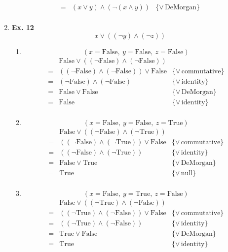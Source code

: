 \documentclass[fleqn]{article}
\newenvironment{proof}
  {\[\begin{array}{lll}}
  {\end{array}\]}
\newcommand{\law}[2][\!]{\{{#1\,}\mbox{{#2}}\}}
\newcommand{\True}[0]{\mathrm{True}}
\newcommand{\False}[0]{\mathrm{False}}
\begin{document}
\begin{enumerate}
\begin{proof}
        = & (x \vee y) \wedge (\neg (x \wedge y)) & \law[\vee]{DeMorgan} \\
      \end{proof}
    \item
      \textbf{ Ex. 12 }
      \[ x \vee ((\neg y) \wedge (\neg z)) \]
      \begin{enumerate}
        \item
          \[ (x = \False,\ y = \False,\ z = \False) \]
          \begin{proof}
              & \False \vee ((\neg \False) \wedge (\neg \False)) & \\
            = & ((\neg \False) \wedge (\neg \False)) \vee \False & \law[\vee]{commutative} \\
            = & (\neg \False) \wedge (\neg \False) & \law[\vee]{identity} \\
            = & \False \vee \False & \law[\vee]{DeMorgan} \\
            = & \False & \law[\vee]{identity} \\
          \end{proof}
        \item
          \[ (x = \False,\ y = \False,\ z = \True) \]
          \begin{proof}
              & \False \vee ((\neg \False) \wedge (\neg \True)) & \\
            = & ((\neg \False) \wedge (\neg \True)) \vee \False & \law[\vee]{commutative} \\
            = & ((\neg \False) \wedge (\neg \True)) & \law[\vee]{identity} \\
            = & \False \vee \True & \law[\vee]{DeMorgan} \\
            = & \True & \law[\vee]{null} \\
          \end{proof}
        \item
          \[ (x = \False,\ y = \True,\ z = \False) \]
          \begin{proof}
              & \False \vee ((\neg \True) \wedge (\neg \False)) & \\
            = & ((\neg \True) \wedge (\neg \False)) \vee \False & \law[\vee]{commutative} \\
            = & ((\neg \True) \wedge (\neg \False)) & \law[\vee]{identity} \\
            = & \True \vee \False & \law[\vee]{DeMorgan} \\
            = & \True & \law[\vee]{identity} \\

\end{proof}
\end{enumerate}
\end{enumerate}
\end{document}
